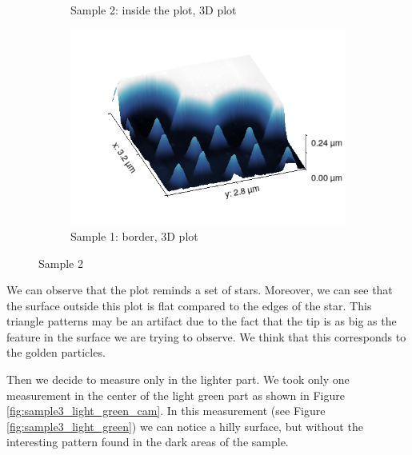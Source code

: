 \documentclass[11pt,a4paper]{article}
\begin{document}
\begin{figure}[H]
\begin{subfigure}[b]{0.45\textwidth}
\caption{Sample 2: inside the plot, 3D plot}
\label{fig:}
\end{subfigure}
\begin{subfigure}[b]{0.45\textwidth}
\includegraphics[width=\textwidth]{sm_sample2_border_3D}
\caption{Sample 1: border, 3D plot}
\label{fig:}
\end{subfigure}
\caption{Sample 2}
\end{figure}

We can observe that the plot reminds a set of stars. Moreover, we can see that the surface outside this plot is flat compared to the edges of the star. This triangle patterns may be an artifact due to the fact that the tip is as big as the feature in the surface we are trying to observe. We think that this corresponds to the golden particles.

Then we decide to measure only in the lighter part. We took only one measurement in the center of the light green part as shown in Figure \ref{fig:sample3_light_green_cam}. In this measurement (see Figure \ref{fig:sample3_light_green}) we can notice a hilly surface, but without the interesting pattern found in the dark areas of the sample.
\end{document}
